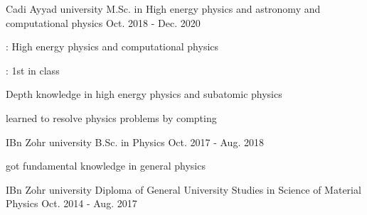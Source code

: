 

\begin{cventries}

  \cventry
    {Cadi Ayyad university} %
        {M.Sc. in High energy physics and astronomy and computational physics } %
    {} %
    {Oct. 2018 - Dec. 2020} %
    {
      \begin{cvitems} %
        \item {:  High energy physics and computational physics}
        \item {: 1st in class}
        \item {Depth knowledge in high energy physics and subatomic physics}
        \item {learned  to resolve physics problems by compting }
      \end{cvitems}
    }

      \cventry
    {IBn Zohr university} %
        {B.Sc. in Physics} %
    {} %
    {Oct. 2017 - Aug. 2018} %
    {
      \begin{cvitems} %
        \item {got fundamental knowledge in general  physics}
      \end{cvitems}
    }

          \cventry
    {IBn Zohr university} %
        {Diploma of General University Studies in Science of Material Physics} %
    {} %
    {Oct. 2014 - Aug. 2017} %
    {
    }
    

\end{cventries}
